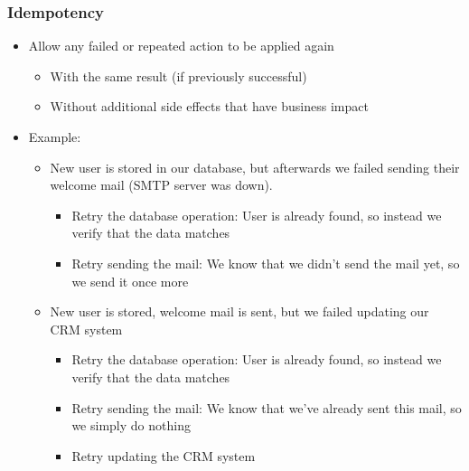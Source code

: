 \documentclass[8pt]{article}
\begin{document}
\subsubsection{Idempotency}
\label{sec:org923a612}
\begin{itemize}
\item Allow any failed or repeated action to be applied again
\begin{itemize}
\item With the same result (if previously successful)
\item Without additional side effects that have business impact
\end{itemize}

\item Example:
\begin{itemize}
\item New user is stored in our database, but afterwards we failed sending their welcome mail (SMTP server was down).
\begin{itemize}
\item Retry the database operation: User is already found, so instead we verify that the data matches
\item Retry sending the mail: We know that we didn't send the mail yet, so we send it once more
\end{itemize}
\item New user is stored, welcome mail is sent, but we failed updating our CRM system
\begin{itemize}
\item Retry the database operation: User is already found, so instead we verify that the data matches
\item Retry sending the mail: We know that we've already sent this mail, so we simply do nothing
\item Retry updating the CRM system
\end{itemize}
\end{itemize}
\end{itemize}
\end{document}
